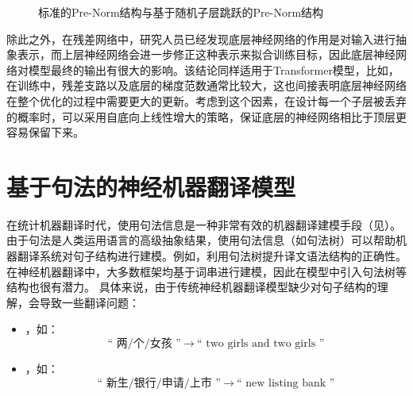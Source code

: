 \begin{figure}[htp]
\centering

\caption{标准的Pre-Norm结构与基于随机子层跳跃的Pre-Norm结构}
\label{fig:15-19}
\end{figure}

\parinterval 除此之外，在残差网络中，研究人员已经发现底层神经网络的作用是对输入进行抽象表示，而上层神经网络会进一步修正这种表示来拟合训练目标，因此底层神经网络对模型最终的输出有很大的影响。该结论同样适用于Transformer模型，比如，在训练中，残差支路以及底层的梯度范数通常比较大，这也间接表明底层神经网络在整个优化的过程中需要更大的更新。考虑到这个因素，在设计每一个子层被丢弃的概率时，可以采用自底向上线性增大的策略，保证底层的神经网络相比于顶层更容易保留下来。


\sectionnewpage
\section{基于句法的神经机器翻译模型}

\parinterval 在统计机器翻译时代，使用句法信息是一种非常有效的机器翻译建模手段（见{\chaptereight}）。由于句法是人类运用语言的高级抽象结果，使用句法信息（如句法树）可以帮助机器翻译系统对句子结构进行建模。例如，利用句法树提升译文语法结构的正确性。在神经机器翻译中，大多数框架均基于词串进行建模，因此在模型中引入句法树等结构也很有潜力。 具体来说，由于传统神经机器翻译模型缺少对句子结构的理解，会导致一些翻译问题：

\begin{itemize}
\vspace{0.5em}
\item {\small{}}，如：
\begin{equation}
\textrm{“ 两/个/女孩 ”}\ \to \ \textrm{“ two girls and two girls ”} \nonumber
\end{equation}

\vspace{0.5em}
\item {\small{}}，如：
\begin{equation}
\textrm{“ 新生/银行/申请/上市 ”}\ \to \ \textrm{“ new listing bank ”} \nonumber
\end{equation}

\vspace{0.5em}
\end{itemize}

